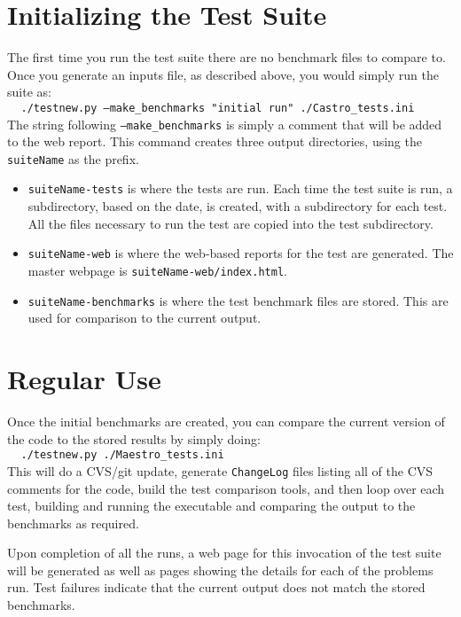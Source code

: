 \section{Initializing the Test Suite}

The first time you run the test suite there are no benchmark files to compare to.
Once you generate an inputs file, as described above, you would simply run the
suite as: \\
$~~~~~${\tt ./testnew.py --make\_benchmarks "initial run" ./Castro\_tests.ini} \\
The string following {\tt --make\_benchmarks} is simply a comment that will
be added to the web report.
This command creates three output directories, using the {\tt suiteName} as the prefix.
\begin{itemize}
\item {\tt suiteName-tests} is where the tests are run.  Each time the test
 suite is run, a subdirectory, based on the date, is created, with a subdirectory
 for each test.  All the files necessary to run the test are copied into the
 test subdirectory.

\item {\tt suiteName-web} is where the web-based reports for the test are generated.
 The master webpage is {\tt suiteName-web/index.html}.

\item {\tt suiteName-benchmarks} is where the test benchmark files are stored.  This
 are used for comparison to the current output.
\end{itemize}



\section{Regular Use}

Once the initial benchmarks are created, you can compare the current
version of the code to the stored results by simply doing: \\
$~~~~~${\tt ./testnew.py ./Maestro\_tests.ini} \\ 
This will do a CVS/git update, generate {\tt ChangeLog} files listing all
of the CVS comments for the code, build the test comparison tools, and
then loop over each test, building and running the executable and
comparing the output to the benchmarks as required.

Upon completion of all the runs, a web page for this invocation of the
test suite will be generated as well as pages showing the details for
each of the problems run.  Test failures indicate that the current
output does not match the stored benchmarks.


